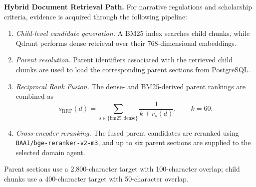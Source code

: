 \textbf{Hybrid Document Retrieval Path.}
For narrative regulations and scholarship criteria, evidence is acquired
through the following pipeline:

\begin{enumerate}
    \setlength{\itemsep}{1.5pt}
    \setlength{\parsep}{0pt}
    \setlength{\parskip}{0pt}
    \item \emph{Child-level candidate generation.}
    A BM25 index searches child chunks, while Qdrant performs dense retrieval
    over their 768-dimensional embeddings.

    \item \emph{Parent resolution.}
    Parent identifiers associated with the retrieved child chunks are used to
    load the corresponding parent sections from PostgreSQL.

    \item \emph{Reciprocal Rank Fusion.}
    The dense- and BM25-derived parent rankings are combined as
    \[
        s_{\mathrm{RRF}}(d)
        = \sum_{s\in\{\mathrm{bm25},\mathrm{dense}\}}
          \frac{1}{k+r_s(d)}, \qquad k=60.
    \]

    \item \emph{Cross-encoder reranking.}
    The fused parent candidates are reranked using
    \texttt{BAAI/bge-reranker-v2-m3}, and up to six parent sections are
    supplied to the selected domain agent.
\end{enumerate}

Parent sections use a 2,800-character target with 100-character overlap;
child chunks use a 400-character target with 50-character overlap.
